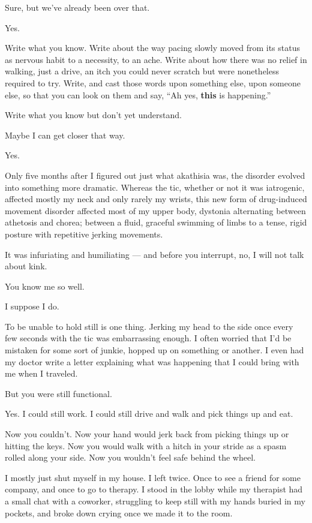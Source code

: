 \begin{ally}
Sure, but we've already been over that.
\end{ally}
Yes.

\begin{ally}
Write what you know. Write about the way pacing slowly moved from its status as nervous habit to a necessity, to an ache. Write about how there was no relief in walking, just a drive, an itch you could never scratch but were nonetheless required to try. Write, and cast those words upon something else, upon someone else, so that you can look on them and say, ``Ah yes, \textbf{this} is happening.''
\end{ally}
\begin{ally}
Write what you know but don't yet understand.
\end{ally}
Maybe I can get closer that way.

\begin{ally}
Yes.
\end{ally}
\newpage

\noindent Only five months after I figured out just what akathisia was, the disorder evolved into something more dramatic. Whereas the tic, whether or not it was iatrogenic, affected mostly my neck and only rarely my wrists, this new form of drug-induced movement disorder affected most of my upper body, dystonia alternating between athetosis and chorea; between a fluid, graceful swimming of limbs to a tense, rigid posture with repetitive jerking movements.

It was infuriating and humiliating --- and before you interrupt, no, I will not talk about kink.

\begin{ally}
You know me so well.
\end{ally}
I suppose I do.

To be unable to hold still is one thing. Jerking my head to the side once every few seconds with the tic was embarrassing enough. I often worried that I'd be mistaken for some sort of junkie, hopped up on something or another. I even had my doctor write a letter explaining what was happening that I could bring with me when I traveled.

\begin{ally}
But you were still functional.
\end{ally}
Yes. I could still work. I could still drive and walk and pick things up and eat.

\begin{ally}
Now you couldn't. Now your hand would jerk back from picking things up or hitting the keys. Now you would walk with a hitch in your stride as a spasm rolled along your side. Now you wouldn't feel safe behind the wheel.
\end{ally}
I mostly just shut myself in my house. I left twice. Once to see a friend for some company, and once to go to therapy. I stood in the lobby while my therapist had a small chat with a coworker, struggling to keep still with my hands buried in my pockets, and broke down crying once we made it to the room.

